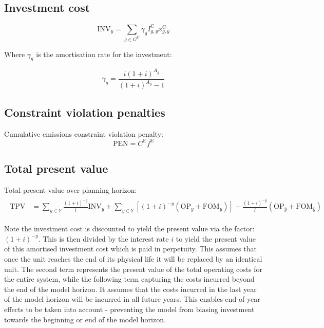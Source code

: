 \documentclass{article}
\newcommand{\sGeneratorsCandidate}{G^{\mathrm{C}}}
\newcommand{\sYears}{Y}
\newcommand{\iGenerator}{g}
\newcommand{\iYear}{y}
\newcommand{\iYearTerminal}{\overline{\iYear}}
\newcommand{\iScenario}{s}
\newcommand{\cOperatingCost}[1][\iYear,\iScenario]{\mathrm{OP}_{#1}}
\newcommand{\cFixedOperationsMaintenanceCost}[1][\iGenerator]{\mathrm{FOM}_{#1}}
\newcommand{\cAmortisationRate}[1][\iGenerator]{\gamma_{#1}}
\newcommand{\cCandidateInvestmentCost}[1][\iGenerator,\iYear]{I^{\mathrm{C}}_{#1}}
\newcommand{\cInvestmentCost}[1][\iYear]{\mathrm{INV}_{#1}}
\newcommand{\cInterestRate}{i}
\newcommand{\cAssetLifetime}[1][\iGenerator]{A_{#1}}
\newcommand{\cTotalPresentValue}[1][]{\mathrm{TPV}_{#1}}
\newcommand{\cEmissionsTargetViolationPenalty}{C^{\mathrm{E}}}
\newcommand{\cEmissionsViolationTotalCost}{\mathrm{PEN}}
\newcommand{\vInstalledCapacity}[1][\iGenerator,\iYear]{x^{\mathrm{C}}_{#1}}
\newcommand{\vEmissionsTargetViolation}{f^{\mathrm{E}}}
\begin{document}
\subsection{Investment cost}

\begin{equation}
	\cInvestmentCost = \sum\limits_{g\in \sGeneratorsCandidate} \cAmortisationRate  \cCandidateInvestmentCost \vInstalledCapacity
\end{equation}

Where $\cAmortisationRate$ is the amortisation rate for the investment:

\begin{equation}
	\cAmortisationRate = \frac{\cInterestRate(1+\cInterestRate)^{\cAssetLifetime}}{(1+\cInterestRate)^{\cAssetLifetime} - 1}
\end{equation}

\subsection{Constraint violation penalties}
Cumulative emissions constraint violation penalty:
\begin{equation}
	\cEmissionsViolationTotalCost = \cEmissionsTargetViolationPenalty \vEmissionsTargetViolation
\end{equation}

\subsection{Total present value}

Total present value over planning horizon:
\begin{align}
	\begin{split}
		\cTotalPresentValue & = \sum\limits_{\iYear \in \sYears} \frac{(1+\cInterestRate)^{-\iYear}}{\cInterestRate}\cInvestmentCost + \sum\limits_{\iYear \in \sYears} \left[(1+\cInterestRate)^{-\iYear} (\cOperatingCost[\iYear] + \cFixedOperationsMaintenanceCost[\iYear]) \right] + \frac{(1+\cInterestRate)^{-\iYearTerminal}}{\cInterestRate} \left(\cOperatingCost[\iYearTerminal] + \cFixedOperationsMaintenanceCost[\iYearTerminal] \right)
	\end{split}
\end{align}

Note the investment cost is discounted to yield the present value via the factor: $(1+\cInterestRate)^{-\iYear}$. This is then divided by the interest rate $i$ to yield the present value of this amortised investment cost which is paid in perpetuity. This assumes that once the unit reaches the end of its physical life it will be replaced by an identical unit. The second term represents the present value of the total operating costs for the entire system, while the following term capturing the costs incurred beyond the end of the model horizon. It assumes that the costs incurred in the last year of the model horizon will be incurred in all future years. This enables end-of-year effects to be taken into account - preventing the model from biasing investment towards the beginning or end of the model horizon.
\end{document}
